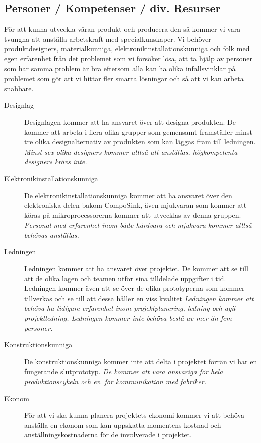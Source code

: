 \documentclass{article}
\begin{document}
	\subsection{Personer / Kompetenser / div. Resurser}
	För att kunna utveckla våran produkt och producera den så kommer vi vara tvungna att anställa arbetskraft med specialkunskaper. Vi behöver produktdesigners, materialkunniga, elektronikinstallationskunniga och folk med egen erfarenhet från det problemet som vi försöker lösa, att ta hjälp av personer som har samma problem är bra eftersom alla kan ha olika infallsvinklar på problemet som gör att vi hittar fler smarta lösningar och så att vi kan arbeta snabbare.
	\begin{description}
		\item[Designlag] Designlagen kommer att ha ansvaret över att designa produkten. De kommer att arbeta i flera olika grupper som gemensamt framställer minst tre olika designalternativ av produkten som kan läggas fram till ledningen. \textit{Minst sex olika designers kommer alltså att anställas, högkompetenta designers krävs inte.}
		\item[Elektronikinstallationskunniga] De elektronikinstallationskunniga kommer att ha ansvaret över den elektroniska delen bakom CompoSink, även mjukvaran som kommer att köras på mikroprocessorerna kommer att utvecklas av denna gruppen. \textit{Personal med erfarenhet inom både hårdvara och mjukvara kommer alltså behövas anställas.}\pagebreak
		\item[Ledningen] Ledningen kommer att ha ansvaret över projektet. De kommer att se till att de olika lagen och teamen utför sina tilldelade uppgifter i tid. Ledningen kommer även att se över de olika prototyperna som kommer tillverkas och se till att dessa håller en viss kvalitet \textit{Ledningen kommer att behöva ha tidigare erfarenhet inom projektplanering, ledning och agil projektledning. Ledningen kommer inte behöva bestå av mer än fem personer.}
		\item[Konstruktionskunniga] De konstruktionskunniga kommer inte att delta i projektet förrän vi har en fungerande slutprototyp. \textit{De kommer att vara ansvariga för hela produktionscykeln och ev. för kommunikation med fabriker.}
		\item[Ekonom] För att vi ska kunna planera projektets ekonomi kommer vi att behöva anställa en ekonom som kan uppskatta momentens kostnad och anställningskostnaderna för de involverade i projektet.

\end{description}
\end{document}
